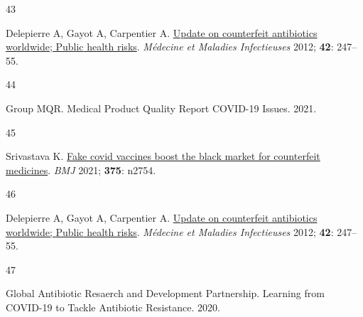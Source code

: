 \documentclass[
  11pt,
  paper=a4,
  ,captions=tableheading
]{scrartcl}
\newlength{\cslhangindent}
\newlength{\csllabelwidth}
\newenvironment{CSLReferences}[2] %
 {%
  \setlength{\parindent}{0pt}
  \ifodd #1 \everypar{\setlength{\hangindent}{\cslhangindent}}\ignorespaces\fi
  \ifnum #2 > 0
  \setlength{\parskip}{#2\baselineskip}
  \fi
 }%
 {}
\newcommand{\CSLLeftMargin}[1]{\parbox[t]{\csllabelwidth}{#1}}
\newcommand{\CSLRightInline}[1]{\parbox[t]{\linewidth - \csllabelwidth}{#1}\break}
\begin{document}
\begin{CSLReferences}{0}{0}
\leavevmode{}%
\CSLLeftMargin{43 }
\CSLRightInline{Delepierre A, Gayot A, Carpentier A.
\href{https://doi.org/10.1016/j.medmal.2012.04.007}{Update on
counterfeit antibiotics worldwide; {Public} health risks}.
\emph{Médecine et Maladies Infectieuses} 2012; \textbf{42}: 247--55.}

\leavevmode{}%
\CSLLeftMargin{44 }
\CSLRightInline{Group MQR. Medical {Product Quality Report}
\textendash{} {COVID-19 Issues}. 2021.}

\leavevmode{}%
\CSLLeftMargin{45 }
\CSLRightInline{Srivastava K.
\href{https://doi.org/10.1136/bmj.n2754}{Fake covid vaccines boost the
black market for counterfeit medicines}. \emph{BMJ} 2021; \textbf{375}:
n2754.}

\leavevmode{}%
\CSLLeftMargin{46 }
\CSLRightInline{Delepierre A, Gayot A, Carpentier A.
\href{https://doi.org/10.1016/j.medmal.2012.04.007}{Update on
counterfeit antibiotics worldwide; {Public} health risks}.
\emph{Médecine et Maladies Infectieuses} 2012; \textbf{42}: 247--55.}

\leavevmode{}%
\CSLLeftMargin{47 }
\CSLRightInline{Global Antibiotic Resaerch and Development Partnership.
Learning from {COVID-19} to {Tackle Antibiotic Resistance}. 2020.}

\end{CSLReferences}
\end{document}
